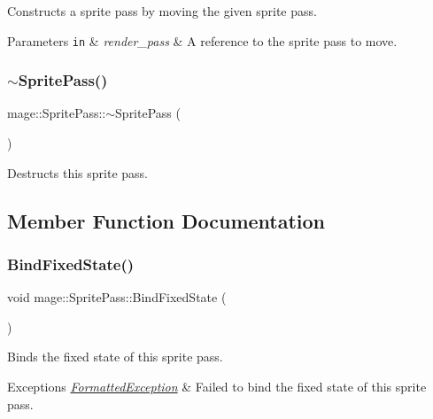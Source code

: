 Constructs a sprite pass by moving the given sprite pass.


\begin{DoxyParams}[1]{Parameters}
\mbox{\tt in}  & {\em render\+\_\+pass} & A reference to the sprite pass to move. \\
\hline
\end{DoxyParams}
\hypertarget{classmage_1_1_sprite_pass_a70a866324750c21196d80364e9a0e309}{}\label{classmage_1_1_sprite_pass_a70a866324750c21196d80364e9a0e309} 
\subsubsection{\texorpdfstring{$\sim$\+Sprite\+Pass()}{~SpritePass()}}
{\footnotesize\ttfamily mage\+::\+Sprite\+Pass\+::$\sim$\+Sprite\+Pass (\begin{DoxyParamCaption}{ }\end{DoxyParamCaption})\hspace{0.3cm}{\ttfamily [default]}}

Destructs this sprite pass. 

\subsection{Member Function Documentation}
\hypertarget{classmage_1_1_sprite_pass_a796f9aad70558e3ae0b792b9c674208d}{}\label{classmage_1_1_sprite_pass_a796f9aad70558e3ae0b792b9c674208d} 
\subsubsection{\texorpdfstring{Bind\+Fixed\+State()}{BindFixedState()}}
{\footnotesize\ttfamily void mage\+::\+Sprite\+Pass\+::\+Bind\+Fixed\+State (\begin{DoxyParamCaption}{ }\end{DoxyParamCaption})}

Binds the fixed state of this sprite pass.


\begin{DoxyExceptions}{Exceptions}
{\em \hyperlink{classmage_1_1_formatted_exception}{Formatted\+Exception}} & Failed to bind the fixed state of this sprite pass. \\
\hline
\end{DoxyExceptions}
\hypertarget{classmage_1_1_sprite_pass_a0044e0756f5f96f24c188424f9769a02}{}\label{classmage_1_1_sprite_pass_a0044e0756f5f96f24c188424f9769a02} 
